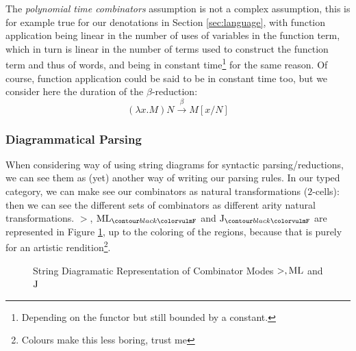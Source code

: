 The \emph{polynomial time combinators} assumption is not a complex assumption,
this is for example true for our denotations in Section \ref{sec:language},
with function application being linear in the number of uses of variables in
the function term, which in turn is linear in the number of terms used to
construct the function term and thus of words, and \fmap being in constant
time\footnote{Depending on the functor but still bounded by a constant.} for
the same reason.
Of course, function application could be said to be in constant time too, but
we consider here the duration of the $\beta$-reduction:
\begin{equation*}
	\left(\lambda x. M\right)N \xrightarrow{\beta} M\left[x / N\right]
\end{equation*}

\subsubsection{Diagrammatical Parsing}
\label{subsubsec:diagram-parsing}
When considering 
way of using string diagrams for syntactic parsing/reductions, we can see them
as (yet) another way of writing our parsing rules.
In our typed category, we can make see our combinators as natural
transformations ($2$-cells): then we can see the different sets of combinators
as different arity natural transformations.
$>$, $\combML_{\f{F}}$ and $\combJ_{\f{F}}$ are represented in
Figure \ref{fig:combinator-sd}, up to the coloring of the regions, because that
is purely for an artistic rendition\footnote{Colours make this less boring,
	trust me}.

\begin{figure}
	\centering
	\caption{String Diagramatic Representation of Combinator Modes $>, \text{ML}$ and $\text{J}$}
	\label{fig:combinator-sd}
\end{figure}

